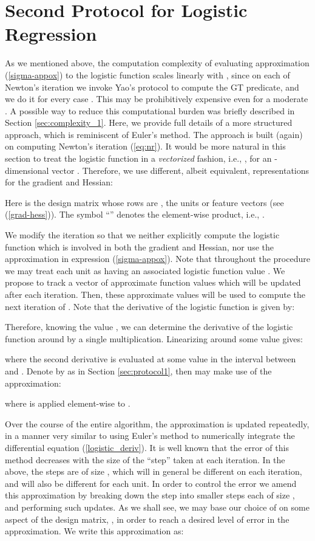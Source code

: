 \documentclass[11pt]{article}
\begin{document}
\section{Second Protocol for Logistic Regression}\label{sec:protocol2}

As we mentioned above, the computation complexity of evaluating  approximation (\ref{sigma-appox}) to the logistic function scales linearly with , since  on each of Newton's iteration we invoke Yao's protocol to compute the GT predicate, and we do it for every case .    This may be prohibitively expensive even for a moderate . A possible way to reduce this computational burden was briefly described in Section \ref{sec:complexity_1}. Here, we provide full details of a more structured approach, which is reminiscent of Euler's method. The approach is built (again) on computing Newton's iteration (\ref{eq:nr}). It would be more natural in this section to treat the logistic function in a {\it vectorized} fashion, i.e., , for an -dimensional vector . Therefore, we use different, albeit equivalent, representations for the gradient and Hessian:

Here  is the design matrix whose rows are , the units or feature vectors (see (\ref{grad-hess})). The symbol ``'' denotes the element-wise product, i.e., .



We modify the iteration so that we neither  explicitly compute the logistic function  which is involved in both the gradient and Hessian, nor use the approximation in expression (\ref{sigma-appox}).  Note that throughout the procedure we may treat each unit  as having an associated logistic function value .  We propose to track a vector of approximate function values  which will be updated after each iteration.  Then, these approximate values will be used to compute the next iteration of .  Note that the derivative of the logistic function is given by:

Therefore, knowing the value , we can determine the derivative of the logistic function around    by a single multiplication.  Linearizing around some value  gives:

where the second derivative is evaluated at some value  in the interval between  and .  Denote by  as in Section \ref{sec:protocol1}, then may make use of the approximation:

where  is applied element-wise to .


Over the course of the entire algorithm, the approximation  is updated repeatedly, in a manner very similar to using Euler's method to numerically integrate the differential equation (\ref{logistic_deriv}).  It is well known that the error of this method decreases with the size of the ``step'' taken at each iteration. In the above, the steps are of size , which will in general be different on each iteration, and will also be different for each unit.  In order to control the error we amend this approximation by breaking down the step into  smaller steps each of size , and performing  such updates.  As we shall see, we may base our choice of  on some aspect of the design matrix,  , in order to reach a desired level of error in the approximation.  We write this approximation as:
\end{document}
